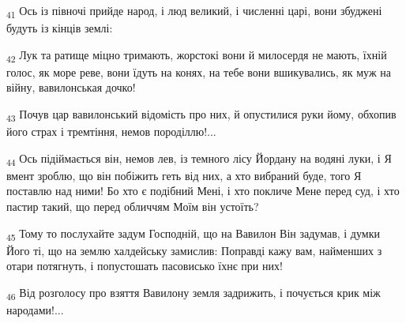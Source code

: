 \begin{tcolorbox}
\textsubscript{41} Ось із півночі прийде народ, і люд великий, і численні царі, вони збуджені будуть із кінців землі:
\end{tcolorbox}
\begin{tcolorbox}
\textsubscript{42} Лук та ратище міцно тримають, жорстокі вони й милосердя не мають, їхній голос, як море реве, вони їдуть на конях, на тебе вони вшикувались, як муж на війну, вавилонськая дочко!
\end{tcolorbox}
\begin{tcolorbox}
\textsubscript{43} Почув цар вавилонський відомість про них, й опустилися руки йому, обхопив його страх і тремтіння, немов породіллю!...
\end{tcolorbox}
\begin{tcolorbox}
\textsubscript{44} Ось підіймається він, немов лев, із темного лісу Йордану на водяні луки, і Я вмент зроблю, що він побіжить геть від них, а хто вибраний буде, того Я поставлю над ними! Бо хто є подібний Мені, і хто покличе Мене перед суд, і хто пастир такий, що перед обличчям Моїм він устоїть?
\end{tcolorbox}
\begin{tcolorbox}
\textsubscript{45} Тому то послухайте задум Господній, що на Вавилон Він задумав, і думки Його ті, що на землю халдейську замислив: Поправді кажу вам, найменших з отари потягнуть, і попустошать пасовисько їхнє при них!
\end{tcolorbox}
\begin{tcolorbox}
\textsubscript{46} Від розголосу про взяття Вавилону земля задрижить, і почується крик між народами!...
\end{tcolorbox}
